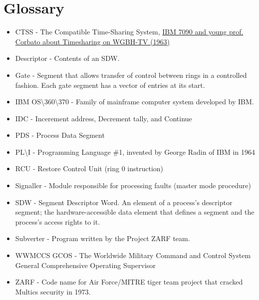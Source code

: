 \section{Glossary}
\begin{itemize}
    \item CTSS - The Compatible Time-Sharing System, \href{https://www.youtube.com/watch?v=Q07PhW5sCEk}{IBM 7090 and young prof. Corbato about Timesharing on WGBH-TV (1963)}
    \item Descriptor - Contents of an SDW.
    \item Gate - Segment that allows transfer of control between rings in a controlled fashion. Each gate segment has a vector of entries at its start.
    \item IBM OS\textbackslash 360\textbackslash 370 - Family of mainframe computer system developed by IBM.
    \item IDC - Incerement address, Decrement tally, and Continue
    \item PDS - Process Data Segment
    \item PL\textbackslash I - Programming Language \#1, invented by George Radin of IBM in 1964
    \item RCU - Restore Control Unit (ring 0 instruction)
    \item Signaller - Module responsible for processing faults (master mode procedure)
    \item SDW - Segment Descriptor Word. An element of a process's descriptor segment; the hardware-accessible data element that defines a segment and the process's access rights to it.
    \item Subverter - Program written by the Project ZARF team.
    \item WWMCCS GCOS -  The Worldwide Military Command and Control System General Comprehensive Operating Supervisor
    \item ZARF - Code name for Air Force/MITRE tiger team project that cracked Multics security in 1973.
\end{itemize}

